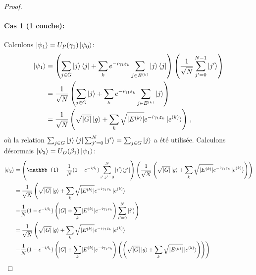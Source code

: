 \begin{proof}
\paragraph{Cas 1 (1 couche):} Calculons $\ket{\psi_{1}} = U_{P}(\gamma_{1}) \ket{\psi_{0}}$:
\begin{equation}
\begin{aligned}
    \ket{\psi_{1}} & = \left(\sum_{j \in G} \ket{j}\bra{j} + \sum_{k} e^{-i \gamma_{1} \varepsilon_{k}} \sum_{j \in E^{(k)}} \ket{j}\bra{j} \right) \left( \frac{1}{ \sqrt{ N }} \sum_{j'=0}^{N-1} \ket{j'} \right) \\
    & = \frac{1}{ \sqrt{ N }} \left( \sum_{j \in G} \ket{j} + \sum_{k} e^{-i \gamma_{1} \varepsilon_{k}} \sum_{j \in E^{(k)}} \ket{j} \right) \\
    & = \frac{1}{ \sqrt{ N }} \left( \sqrt{ \lvert G \rvert  } \ket{g} + \sum_{k} \sqrt{ \lvert E^{(k)} \rvert  } e^{-i \gamma_{1} \varepsilon_{k}} \ket{e^{(k)}} \right) \,,
\end{aligned}
\end{equation}
où la relation $\sum_{j \in G}\ket{j}\bra{j} \sum_{j'=0}^{N} \ket{j'} = \sum_{j \in G} \ket{j}$ a été utilisée. Calculons désormais $\ket{\psi_{2}} = U_{D} (\beta_{1})\ket{\psi_{1}}$:
\begin{equation}
\begin{aligned}
    \ket{\psi_{2}} &= \left( \mathbb{1} - \frac{1}{N} (1 - e^{-i\beta_{1}}) \sum_{i',j'=0}^{N} \ket{i'}\!\bra{j'} \right) \left( \frac{1}{ \sqrt{ N }} \left( \sqrt{ \lvert G \rvert  } \ket{g} + \sum_{k} \sqrt{ \lvert E^{(k)} \rvert  } e^{-i \gamma_{1} \varepsilon_{k}}  \ket{e^{(k)}} \right) \right) \\
    &=  \frac{1}{ \sqrt{ N }} \left( \sqrt{ \lvert G \rvert  } \ket{g} + \sum_{k} \sqrt{ \lvert E^{(k)} \rvert  } e^{-i \gamma_{1} \varepsilon_{k}}  \ket{e^{(k)}} \right. \\
    & \left. - \frac{1}{N} (1 - e^{-i\beta_{1}}) \left( \lvert G \rvert + \sum_{k} \lvert E^{(k)} \rvert e^{-i \gamma_{1} \varepsilon_{k}} \right) \sum_{i'=0}^{N} \ket{i'} \right) \\
    &=  \frac{1}{ \sqrt{ N }} \left( \sqrt{ \lvert G \rvert  } \ket{g} + \sum_{k} \sqrt{ \lvert E^{(k)} \rvert  } e^{-i \gamma_{1} \varepsilon_{k}}  \ket{e^{(k)}} \right. \\
    & \left. - \frac{1}{N} (1 - e^{-i\beta_{1}}) \left( \lvert G \rvert + \sum_{k} \lvert E^{(k)} \rvert e^{-i \gamma_{1} \varepsilon_{k}}   \right) \left( \left( \sqrt{ \lvert G \rvert  } \ket{g} + \sum_{k} \sqrt{ \lvert E^{(k)} \rvert } \ket{e^{(k)}} \right) \right) \right) \\

\end{aligned}
\end{equation}
\end{proof}
